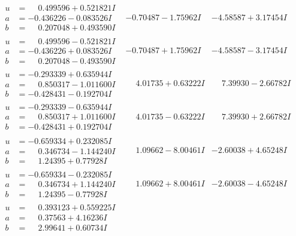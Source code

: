 \documentclass[1p]{elsarticle_modified}
\theoremstyle{definition}
\begin{document}
$$\begin{array}{c|c|c}
\begin{aligned}
u &= \phantom{-}0.499596 + 0.521821 I \\
a &= -0.436226 - 0.083526 I \\
b &= \phantom{-}0.207048 + 0.493590 I\end{aligned}
 & -0.70487 - 1.75962 I & -4.58587 + 3.17454 I \\ \hline\begin{aligned}
u &= \phantom{-}0.499596 - 0.521821 I \\
a &= -0.436226 + 0.083526 I \\
b &= \phantom{-}0.207048 - 0.493590 I\end{aligned}
 & -0.70487 + 1.75962 I & -4.58587 - 3.17454 I \\ \hline\begin{aligned}
u &= -0.293339 + 0.635944 I \\
a &= \phantom{-}0.850317 - 1.011600 I \\
b &= -0.428431 - 0.192704 I\end{aligned}
 & \phantom{-}4.01735 + 0.63222 I & \phantom{-}7.39930 - 2.66782 I \\ \hline\begin{aligned}
u &= -0.293339 - 0.635944 I \\
a &= \phantom{-}0.850317 + 1.011600 I \\
b &= -0.428431 + 0.192704 I\end{aligned}
 & \phantom{-}4.01735 - 0.63222 I & \phantom{-}7.39930 + 2.66782 I \\ \hline\begin{aligned}
u &= -0.659334 + 0.232085 I \\
a &= \phantom{-}0.346734 - 1.144240 I \\
b &= \phantom{-}1.24395 + 0.77928 I\end{aligned}
 & \phantom{-}1.09662 - 8.00461 I & -2.60038 + 4.65248 I \\ \hline\begin{aligned}
u &= -0.659334 - 0.232085 I \\
a &= \phantom{-}0.346734 + 1.144240 I \\
b &= \phantom{-}1.24395 - 0.77928 I\end{aligned}
 & \phantom{-}1.09662 + 8.00461 I & -2.60038 - 4.65248 I \\ \hline\begin{aligned}
u &= \phantom{-}0.393123 + 0.559225 I \\
a &= \phantom{-}0.37563 + 4.16236 I \\
b &= \phantom{-}2.99641 + 0.60734 I\end{aligned}

\end{array}$$
\end{document}
